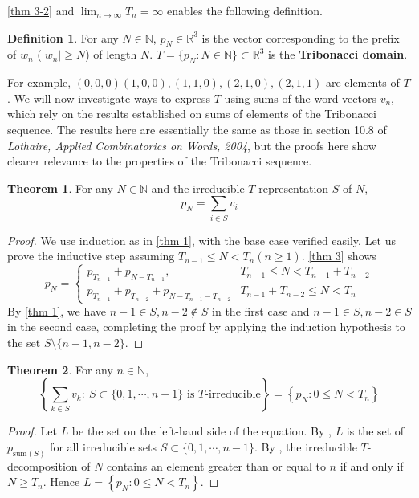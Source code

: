 \documentclass{article}
\theoremstyle{definition}
\newtheorem{theorem}{Theorem}
\newtheorem*{definition}{Definition}
\begin{document}
\cref{thm 3-2} and $\lim_{n\rightarrow\infty}T_n=\infty$ enables the following definition.

\begin{definition}
For any $N\in\mathbb{N}$, $p_N\in \mathbb{R}^3$ is the vector corresponding to the prefix of $w_n$ ($|w_n|\geq N$) of length $N$. $T=\{p_N:N\in \mathbb{N}\}\subset \mathbb{R}^3$  is the \textbf{Tribonacci domain}.
\end{definition}
For example, $(0,0,0) (1,0,0), (1,1,0), (2,1,0), (2,1,1)$ are elements of $T$. We will now investigate ways to express $T$ using sums of the word vectors $v_n$, which rely on the results established on sums of elements of the Tribonacci sequence. The results here are essentially the same as those in section 10.8 of \textit{Lothaire, Applied Combinatorics on Words, 2004}, but the proofs here show clearer relevance to the properties of the Tribonacci sequence.
\begin{theorem}
\label{thm 4}
For any $N\in\mathbb{N}$ and the irreducible $T$-representation $S$ of $N$, \[ p_N=\sum_{i\in S} v_i\]
\end{theorem}
\begin{proof}
We use induction as in \cref{thm 1}, with the base case verified easily. Let us prove the inductive step assuming $T_{n-1}\leq N<T_n(n\geq 1)$. \cref{thm 3} shows \[p_N=\begin{cases}
    p_{T_{n-1}}+p_{N-T_{n-1}}, &T_{n-1}\leq N<T_{n-1}+T_{n-2}\\ 
    p_{T_{n-1}}+p_{T_{n-2}}+p_{N-T_{n-1}-T_{n-2}} &T_{n-1}+T_{n-2}\leq N<T_{n}
\end{cases}\]
By \cref{thm 1}, we have $n-1\in S, n-2\notin S$ in the first case and $n-1\in S, n-2\in S$ in the second case, completing the proof by applying the induction hypothesis to the set $S\setminus\{n-1, n-2\}$.

\end{proof}

\begin{theorem}
\label{thm 5-1}
For any $n\in\mathbb{N}$,
\[
\left\{ \sum_{k\in S}v_k:\ S\subset \{0,1,\cdots,n-1\}  \text{ is $T$-irreducible} \right\} = \left\{ p_N: 0\leq N<T_n \right\}
\]
\end{theorem}
\begin{proof}
Let $L$ be the set on the left-hand side of the equation. By , $L$ is the set of $p_{\text{sum}(S)}$ for all irreducible sets $S\subset\{0,1,\cdots,n-1\}$. By , the irreducible $T$-decomposition of $N$ contains an element greater than or equal to $n$ if and only if $N\geq T_n$. Hence $L=\left\{ p_N: 0\leq N<T_n \right\}$.
\end{proof}
\end{document}
